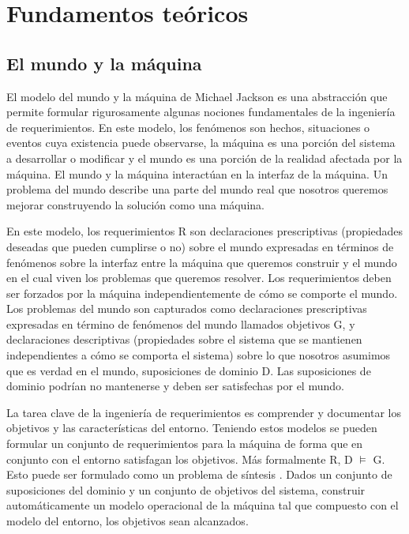 \chapter{Fundamentos teóricos}

\section{El mundo y la máquina}
El modelo del mundo y la máquina de Michael Jackson \cite{MundoMaquina} es una abstracción que permite formular rigurosamente 
algunas nociones fundamentales de la ingeniería de requerimientos. En este modelo, los fenómenos son hechos, situaciones o 
eventos cuya existencia puede observarse, la máquina es una porción del sistema a desarrollar o modificar y el mundo es una 
porción de la realidad afectada por la máquina. El mundo y la máquina interactúan en la interfaz de la máquina. Un problema 
del mundo describe una parte del mundo real que nosotros queremos mejorar construyendo la solución como una máquina.

\vspace{\baselineskip} 
En este modelo, los requerimientos R son declaraciones prescriptivas (propiedades deseadas que pueden cumplirse o no) sobre 
el mundo expresadas en términos de fenómenos sobre la interfaz entre la máquina que queremos construir y el mundo en el cual 
viven los problemas que queremos resolver. Los requerimientos deben ser forzados por la máquina independientemente de cómo 
se comporte el mundo. Los problemas del mundo son capturados como declaraciones prescriptivas expresadas en término de 
fenómenos del mundo llamados objetivos G, y declaraciones descriptivas (propiedades sobre el sistema que se mantienen 
independientes a cómo se comporta el sistema) sobre lo que nosotros asumimos que es verdad en el mundo, suposiciones 
de dominio D. Las suposiciones de dominio podrían no mantenerse y deben ser satisfechas por el mundo.

\vspace{\baselineskip}
La tarea clave de la ingeniería de requerimientos es comprender y documentar los objetivos y las características del entorno. 
Teniendo estos modelos se pueden formular un conjunto de requerimientos para la máquina de forma que en conjunto con el 
entorno satisfagan los objetivos. Más formalmente R, D $\vDash$ G. 
Esto puede ser formulado como un problema de síntesis \cite{Sintesis}. Dados un conjunto de suposiciones del dominio y un conjunto de 
objetivos del sistema, construir  automáticamente un modelo operacional de la máquina tal que compuesto con el modelo del 
entorno, los objetivos sean alcanzados.

